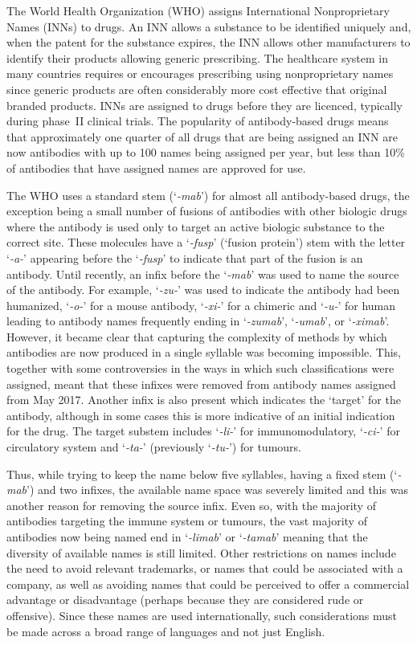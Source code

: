 \documentclass{article}
\newcommand{\eg}[1]{\mbox{`\emph{#1}'}}
\begin{document}
The World Health Organization (WHO) assigns International
Nonproprietary Names (INNs) to drugs. An INN allows a substance to be
identified uniquely and, when the patent for the substance expires,
the INN allows other manufacturers to identify their products allowing
generic prescribing. The healthcare system in many countries requires
or encourages prescribing using nonproprietary names since generic
products are often considerably more cost effective that original
branded products. INNs are assigned to drugs before they are licenced,
typically during phase~II clinical trials. The popularity of
antibody-based drugs means that approximately one quarter of all drugs
that are being assigned an INN are now antibodies with up to 100 names
being assigned per year, but less than 10\% of antibodies that have
assigned names are approved for use.

The WHO uses a standard stem (\eg{-mab}) for almost all antibody-based
drugs, the exception being a small number of fusions of antibodies
with other biologic drugs where the antibody is used only to target an
active biologic substance to the correct site. These molecules have a
\eg{-fusp} (`fusion protein') stem with the letter \eg{-a-} appearing
before the \eg{-fusp} to indicate that part of the fusion is an
antibody. Until recently, an infix before the \eg{-mab} was used to
name the source of the antibody. For example, \eg{-zu-} was used to
indicate the antibody had been humanized, \eg{-o-} for a mouse
antibody, \eg{-xi-} for a chimeric and \eg{-u-} for
human\cite{inn:stembook} leading to antibody names frequently ending
in \eg{-zumab}, \eg{-umab}, or \eg{-ximab}. However, it became clear
that capturing the complexity of methods by which antibodies are now
produced in a single syllable was becoming impossible. This, together
with some controversies in the ways in which such classifications were
assigned, meant that these infixes were removed from antibody names
assigned from May 2017\cite{inn:2017scheme,parren:names2017}. Another
infix is also present which indicates the `target' for the antibody,
although in some cases this is more indicative of an initial
indication for the drug. The target substem includes \eg{-li-} for
immunomodulatory, \eg{-ci-} for circulatory system and \eg{-ta-}
(previously \eg{-tu-}) for tumours.

Thus, while trying to keep the name below five syllables, having a
fixed stem (\eg{-mab}) and two infixes, the available name space was
severely limited and this was another reason for removing the source
infix. Even so, with the majority of antibodies targeting the immune
system or tumours, the vast majority of antibodies now being named end
in \eg{-limab} or \eg{-tamab} meaning that the diversity of available
names is still limited. Other restrictions on names include the need
to avoid relevant trademarks, or names that could be associated with a
company, as well as avoiding names that could be perceived to offer a
commercial advantage or disadvantage (perhaps because they are
considered rude or offensive). Since these names are used
internationally, such considerations must be made across a broad range
of languages and not just English.
\end{document}
